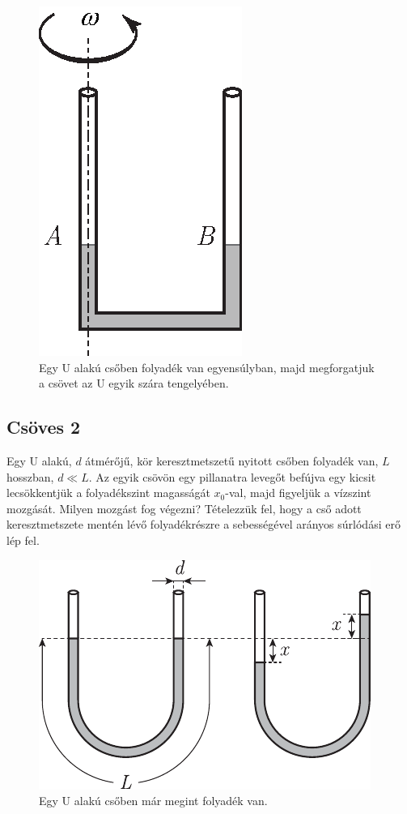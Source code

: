 \documentclass[12pt,a4paper]{scrartcl}
\begin{document}
\begin{figure}[htb] 
\centering    
\includegraphics[scale=1]{figs/bernoUlli.eps}
\caption{Egy U alakú csőben folyadék van egyensúlyban, majd megforgatjuk a csövet az U egyik szára tengelyében.}
\label{fig:ucsoves}
\end{figure}
\FloatBarrier

\subsection{Csöves 2}
Egy U alakú, $d$ átmérőjű, kör keresztmetszetű nyitott csőben folyadék van, $L$ hosszban, $d \ll L$. Az egyik csövön egy pillanatra levegőt befújva egy kicsit lecsökkentjük a folyadékszint magasságát $x_0$-val, majd figyeljük a vízszint mozgását. Milyen mozgást fog végezni? Tételezzük fel, hogy a cső adott keresztmetszete mentén lévő folyadékrészre a sebességével arányos súrlódási erő lép fel.
\begin{figure}[htb] 
\centering    
\includegraphics[scale=1]{figs/ucsoves2.pdf}
\caption{Egy U alakú csőben már megint folyadék van.}
\label{fig:ucsoves2}
\end{figure}
\FloatBarrier
\end{document}
